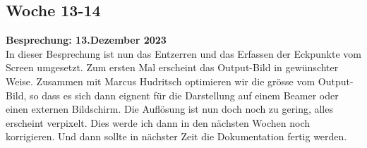 \subsection{Woche 13-14}
\textbf{Besprechung: 13.Dezember 2023} \\
In dieser Besprechung ist nun das Entzerren und das Erfassen der Eckpunkte vom Screen umgesetzt. Zum ersten Mal erscheint das Output-Bild in gewünschter Weise. Zusammen mit Marcus Hudritsch optimieren wir die grösse vom Output-Bild, so dass es sich dann eignent für die Darstellung auf einem Beamer oder einen externen Bildschirm. Die Auflösung ist nun doch noch zu gering, alles erscheint verpixelt. Dies werde ich dann in den nächsten Wochen noch korrigieren. Und dann sollte in nächster Zeit die Dokumentation fertig werden.